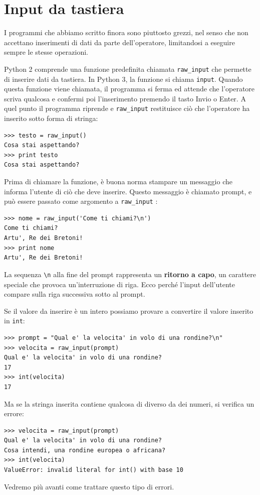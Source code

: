 \documentclass[10pt]{book}
\begin{document}
\section{Input da tastiera}

I programmi che abbiamo scritto finora sono piuttosto grezzi, nel senso che non accettano inserimenti di dati da parte dell'operatore, limitandosi a eseguire sempre le stesse operazioni.

Python 2 comprende una funzione predefinita chiamata \verb"raw_input" che permette di inserire dati da tastiera. In Python 3, la funzione si chiama
  {\tt input}. Quando questa funzione viene chiamata, il programma si ferma ed attende che l'operatore scriva qualcosa e confermi poi l'inserimento premendo il tasto {\sf Invio} o {\sf Enter}. A quel punto il programma riprende e \verb"raw_input" restituisce ciò che l'operatore ha inserito sotto forma di stringa:

\begin{verbatim}
>>> testo = raw_input()
Cosa stai aspettando?
>>> print testo
Cosa stai aspettando?
\end{verbatim}
%
Prima di chiamare la funzione, è buona norma stampare un messaggio che informa l'utente di ciò che deve inserire. Questo messaggio è chiamato prompt, e può essere passato come argomento a \verb"raw_input" :

\begin{verbatim}
>>> nome = raw_input('Come ti chiami?\n')
Come ti chiami?
Artu', Re dei Bretoni!
>>> print nome
Artu', Re dei Bretoni!
\end{verbatim}
%
La sequenza \verb"\n" alla fine del prompt rappresenta un {\bf ritorno a capo},
un carattere speciale che provoca un'interruzione di riga. Ecco perché l'input dell'utente compare sulla riga successiva sotto al prompt.

Se il valore da inserire è un intero possiamo provare a convertire il valore inserito in {\tt int}:


\begin{verbatim}
>>> prompt = "Qual e' la velocita' in volo di una rondine?\n"
>>> velocita = raw_input(prompt)
Qual e' la velocita' in volo di una rondine?
17
>>> int(velocita)
17
\end{verbatim}
%
Ma se la stringa inserita contiene qualcosa di diverso da dei numeri, si verifica un errore:

\begin{verbatim}
>>> velocita = raw_input(prompt)
Qual e' la velocita' in volo di una rondine?
Cosa intendi, una rondine europea o africana?
>>> int(velocita)
ValueError: invalid literal for int() with base 10
\end{verbatim}
%
Vedremo più avanti come trattare questo tipo di errori.
\end{document}
